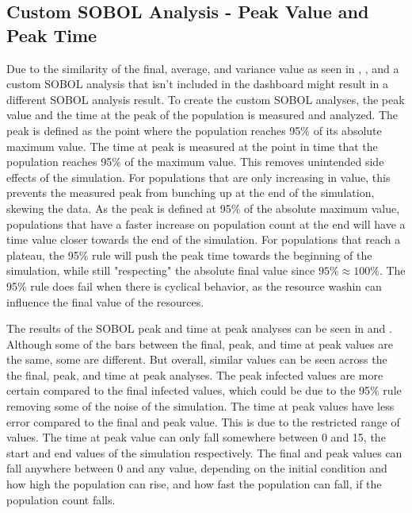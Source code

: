 \subsection{Custom SOBOL Analysis - Peak Value and Peak Time}
Due to the similarity of the final, average, and variance value as seen in , , and  a custom SOBOL analysis that isn't included in the dashboard might result in a different SOBOL analysis result. 
To create the custom SOBOL analyses, the peak value and the time at the peak of the population is measured and analyzed. 
The peak is defined as the point where the population reaches 95\% of its absolute maximum value. 
The time at peak is measured at the point in time that the population reaches 95\% of the maximum value. 
This removes unintended side effects of the simulation. 
For populations that are only increasing in value, this prevents the measured peak from bunching up at the end of the simulation, skewing the data. 
As the peak is defined at 95\% of the absolute maximum value, populations that have a faster increase on population count at the end will have a time value closer towards the end of the simulation. 
For populations that reach a plateau, the 95\% rule will push the peak time towards the beginning of the simulation, while still "respecting" the absolute final value since $95\% \approx 100\%$. 
The 95\% rule does fail when there is cyclical behavior, as the resource washin can influence the final value of the resources. 

The results of the SOBOL peak and time at peak analyses can be seen in  and . 
Although some of the bars between the final, peak, and time at peak values are the same, some are different. 
But overall, similar values can be seen across the the final, peak, and time at peak analyses. 
The peak infected values are more certain compared to the final infected values, which could be due to the 95\% rule removing some of the noise of the simulation. 
The time at peak values have less error compared to the final and peak value. 
This is due to the restricted range of values. The time at peak value can only fall somewhere between 0 and 15, the start and end values of the simulation respectively. 
The final and peak values can fall anywhere between 0 and any value, depending on the initial condition and how high the population can rise, and how fast the population can fall, if the population count falls. 


